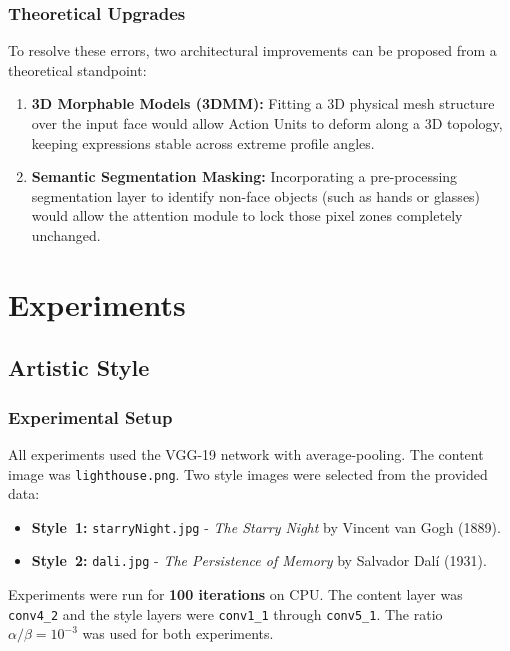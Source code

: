 \documentclass{article}
\begin{document}
\subsubsection{Theoretical Upgrades}
To resolve these errors, two architectural improvements can be proposed from a theoretical standpoint:
\begin{enumerate}
    \item \textbf{3D Morphable Models (3DMM):} Fitting a 3D physical mesh structure over the input face would allow Action Units to deform along a 3D topology, keeping expressions stable across extreme profile angles.
    \item \textbf{Semantic Segmentation Masking:} Incorporating a pre-processing segmentation layer to identify non-face objects (such as hands or glasses) would allow the attention module to lock those pixel zones completely unchanged.
\end{enumerate}


\section{Experiments}
\label{sec:Experiments}

\subsection{Artistic Style}
\label{sec:exp_style}

\subsubsection{Experimental Setup}

All experiments used the VGG-19 network with average-pooling. The content
image was \texttt{lighthouse.png}. Two style images
were selected from the provided data:

\begin{itemize}
\item \textbf{Style~1:} \texttt{starryNight.jpg} - \textit{The Starry Night} by Vincent van Gogh (1889).
\item \textbf{Style~2:} \texttt{dali.jpg} - \textit{The Persistence of Memory} by Salvador Dalí (1931).
\end{itemize}

Experiments were run for \textbf{100 iterations} on CPU. The content layer was \texttt{conv4\_2}
and the style layers were \texttt{conv1\_1} through \texttt{conv5\_1}.
The ratio $\alpha/\beta = 10^{-3}$ was used for both
experiments.
\end{document}
